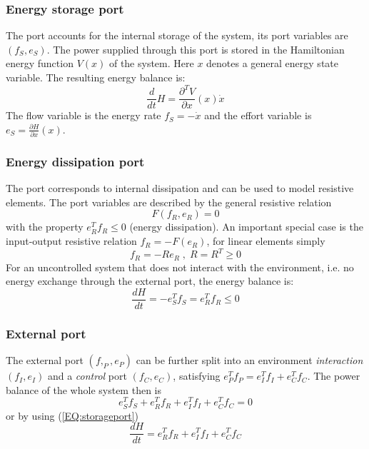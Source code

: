 \documentclass[a4paper,twoside, openright,12pt]{report}
\begin{document}
\subsubsection{Energy storage port}
The port accounts for the internal storage of the system, its port variables are $ (f_S,e_S) $. The power supplied through this port is stored in the Hamiltonian energy function $V(x)$ of the system. Here $x$ denotes a general energy state variable. The resulting energy balance is:
\begin{equation}\label{EQ:storageport}
	\frac{d}{dt}H = \frac{\partial^T V}{\partial x}(x) \dot{x}
\end{equation}
The flow variable is the energy rate $ f_S = -\dot{x} $ and the effort variable is $ e_S = \frac{\partial H}{\partial x}(x) $.

\subsubsection{Energy dissipation port}
The port corresponds to internal dissipation and can be used to model resistive elements. The port variables are described by the general resistive relation
\begin{equation}
	F(f_R,e_R)=0
\end{equation}
with the property  $ e_R^T  f_R \leq 0 $ (energy dissipation). An important special case is the input-output resistive relation $f_R = -F(e_R)$, for linear elements simply
\begin{equation}
f_R = -Re_R \; , \; R=R^T\geq0
\end{equation}
For an uncontrolled system that does not interact with the environment, i.e. no energy exchange through the  external port, the energy balance is:
\begin{equation}
	\frac{dH}{dt} = -e_S^Tf_S = e_R^T f_R \leq 0
\end{equation}

\subsubsection{External port}
The external port $(f,_P,e_P)$ can be further split into an environment \emph{interaction} $(f_I,e_I)$ and a \emph{control} port $(f_C,e_C)$, satisfying $e_P^Tf_P = e_I^Tf_I + e_C^Tf_C$.
The power balance of the whole system then is
\begin{equation}
	e_S^Tf_S + e_R^T f_R +e_I^Tf_I + e_C^T f_C = 0
\end{equation} 
or by using (\ref{EQ:storageport})
\begin{equation}\label{EQ:energybalance}
	\frac{dH}{dt} = e_R^T f_R +e_I^Tf_I + e_C^T f_C 
\end{equation}
\end{document}
